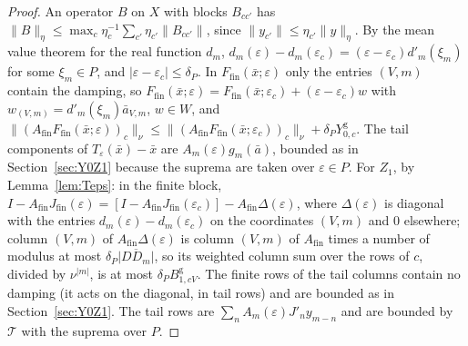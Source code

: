 \documentclass[11pt]{article}
\theoremstyle{definition}
\begin{document}
\begin{proof}
An operator $B$ on $X$ with blocks $B_{cc'}$ has $\|B\|_\eta \le \max_c\eta_c^{-1}\sum_{c'}\eta_{c'}\|B_{cc'}\|$, since $\|y_{c'}\| \le \eta_{c'}\|y\|_\eta$. By the mean value theorem for the real function $d_m$, $d_m(\varepsilon) - d_m(\varepsilon_c) = (\varepsilon - \varepsilon_c)d'_m(\xi_m)$ for some $\xi_m \in P$, and $|\varepsilon - \varepsilon_c| \le \delta_P$. In $F_{\mathrm{fin}}(\bar x;\varepsilon)$ only the entries $(V, m)$ contain the damping, so $F_{\mathrm{fin}}(\bar x;\varepsilon) = F_{\mathrm{fin}}(\bar x;\varepsilon_c) + (\varepsilon - \varepsilon_c)w$ with $w_{(V,m)} = d'_m(\xi_m)\bar a_{V,m}$, $w \in W$, and $\|(A_{\mathrm{fin}}F_{\mathrm{fin}}(\bar x;\varepsilon))_c\|_\nu \le \|(A_{\mathrm{fin}}F_{\mathrm{fin}}(\bar x;\varepsilon_c))_c\|_\nu + \delta_PY^{\mathrm g}_{0,c}$. The tail components of $T_\varepsilon(\bar x) - \bar x$ are $A_m(\varepsilon)g_m(\bar a)$, bounded as in Section~\ref{sec:Y0Z1} because the suprema are taken over $\varepsilon \in P$. For $Z_1$, by Lemma~\ref{lem:Teps}: in the finite block, $I - A_{\mathrm{fin}}J_{\mathrm{fin}}(\varepsilon) = [I - A_{\mathrm{fin}}J_{\mathrm{fin}}(\varepsilon_c)] - A_{\mathrm{fin}}\Delta(\varepsilon)$, where $\Delta(\varepsilon)$ is diagonal with the entries $d_m(\varepsilon) - d_m(\varepsilon_c)$ on the coordinates $(V, m)$ and $0$ elsewhere; column $(V, m)$ of $A_{\mathrm{fin}}\Delta(\varepsilon)$ is column $(V, m)$ of $A_{\mathrm{fin}}$ times a number of modulus at most $\delta_P\overline{|DD_m|}$, so its weighted column sum over the rows of $c$, divided by $\nu^{|m|}$, is at most $\delta_PB^{\mathrm g}_{1,cV}$. The finite rows of the tail columns contain no damping (it acts on the diagonal, in tail rows) and are bounded as in Section~\ref{sec:Y0Z1}. The tail rows are $\sum_nA_m(\varepsilon)J'_ny_{m-n}$ and are bounded by $\mathcal T$ with the suprema over $P$.
\end{proof}
\end{document}
